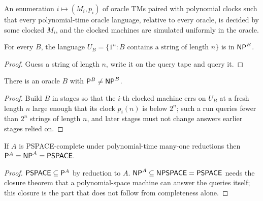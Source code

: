\begin{definition}
  \label{def:barriers-clocked-enumeration}
  \notready
  An enumeration $i \mapsto (M_i, p_i)$ of oracle TMs paired with polynomial
  clocks such that every polynomial-time oracle language, relative to every
  oracle, is decided by some clocked $M_i$, and the clocked machines are
  simulated uniformly in the oracle.
\end{definition}

\begin{lemma}
  \label{lem:barriers-unary-test-language}
  \notready
  For every $B$, the language $U_B = \{1^n : B \text{ contains a string of
  length } n\}$ is in $\mathsf{NP}^B$.
\end{lemma}
\begin{proof}
  Guess a string of length $n$, write it on the query tape and query it.
\end{proof}

\begin{theorem}
  \label{thm:barriers-separating-oracle}
  \notready
  There is an oracle $B$ with $\mathsf{P}^B \neq \mathsf{NP}^B$.
\end{theorem}
\begin{proof}
  Build $B$ in stages so that the $i$-th clocked machine errs on $U_B$ at a
  fresh length $n$ large enough that its clock $p_i(n)$ is below $2^n$; such a
  run queries fewer than $2^n$ strings of length $n$, and later stages must not
  change answers earlier stages relied on.
\end{proof}

\begin{lemma}
  \label{lem:barriers-pspace-oracle-collapse}
  \notready
  If $A$ is PSPACE-complete under polynomial-time many-one reductions then
  $\mathsf{P}^A = \mathsf{NP}^A = \mathsf{PSPACE}$.
\end{lemma}
\begin{proof}
  $\mathsf{PSPACE} \subseteq \mathsf{P}^A$ by reduction to $A$. $\mathsf{NP}^A \subseteq
  \mathsf{NPSPACE} = \mathsf{PSPACE}$ needs the closure theorem that a polynomial-space
  machine can answer the queries itself; this closure is the part that does
  not follow from completeness alone.
\end{proof}

